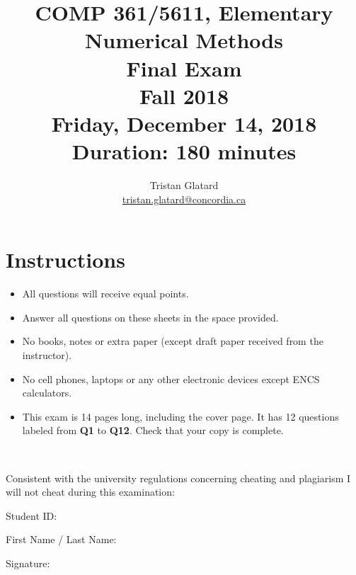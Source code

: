 \documentclass{llncs}
\title{COMP 361/5611, Elementary Numerical Methods \\ Final Exam \\ Fall 2018 \\ Friday, December 14, 2018 \\ Duration: 180 minutes}
\author{Tristan Glatard\\
  \href{mailto:tristan.glatard@concordia.ca}{tristan.glatard@concordia.ca}\\
  \vspace*{0.3cm}
  }
\institute{Concordia University\\
  Department of Computer Science and Software Engineering}
\newcounter{ques}
\newcommand{\myspace}[0]{\vspace*{0.25cm}}
\begin{document}
\maketitle

\section*{Instructions}
\begin{itemize}
\item All questions will receive equal points.
\item Answer all questions on these sheets in the space provided.
\item No books, notes or extra paper (except draft paper received from the instructor).
\item No cell phones, laptops or any other electronic devices except ENCS calculators.
\item This exam is 14 pages long, including the cover page. It has
  12 questions labeled from \textbf{Q1} to \textbf{Q12}. Check that your copy
  is complete.
\end{itemize}

\myspace

\myspace

\hrulefill\\

\myspace

Consistent with the university regulations concerning cheating and plagiarism I will not cheat during this examination:

\myspace

\myspace

Student ID: \dotfill

\myspace

\myspace

First Name / Last Name: \dotfill

\myspace

\myspace

Signature: \dotfill
\end{document}
